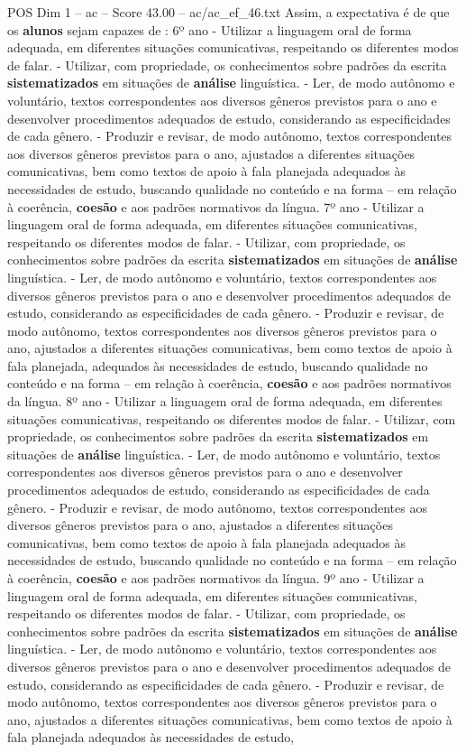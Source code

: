 \begin{textsample}{POS Dim 1 – ac – Score 43.00 – ac/ac\_ef\_46.txt}
Assim, a expectativa é de que os \textbf{alunos} sejam capazes de : 6º ano - Utilizar a linguagem oral de forma adequada, em diferentes situações comunicativas, respeitando os diferentes modos de falar. - Utilizar, com propriedade, os conhecimentos sobre padrões da escrita \textbf{sistematizados} em situações de \textbf{análise} linguística. - Ler, de modo autônomo e voluntário, textos correspondentes aos diversos gêneros previstos para o ano e desenvolver procedimentos adequados de estudo, considerando as especificidades de cada gênero. - Produzir e revisar, de modo autônomo, textos correspondentes aos diversos gêneros previstos para o ano, ajustados a diferentes situações comunicativas, bem como textos de apoio à fala planejada adequados às necessidades de estudo, buscando qualidade no conteúdo e na forma – em relação à coerência, \textbf{coesão} e aos padrões normativos da língua. 7º ano - Utilizar a linguagem oral de forma adequada, em diferentes situações comunicativas, respeitando os diferentes modos de falar. - Utilizar, com propriedade, os conhecimentos sobre padrões da escrita \textbf{sistematizados} em situações de \textbf{análise} linguística. - Ler, de modo autônomo e voluntário, textos correspondentes aos diversos gêneros previstos para o ano e desenvolver procedimentos adequados de estudo, considerando as especificidades de cada gênero. - Produzir e revisar, de modo autônomo, textos correspondentes aos diversos gêneros previstos para o ano, ajustados a diferentes situações comunicativas, bem como textos de apoio à fala planejada, adequados às necessidades de estudo, buscando qualidade no conteúdo e na forma – em relação à coerência, \textbf{coesão} e aos padrões normativos da língua. 8º ano - Utilizar a linguagem oral de forma adequada, em diferentes situações comunicativas, respeitando os diferentes modos de falar. - Utilizar, com propriedade, os conhecimentos sobre padrões da escrita \textbf{sistematizados} em situações de \textbf{análise} linguística. - Ler, de modo autônomo e voluntário, textos correspondentes aos diversos gêneros previstos para o ano e desenvolver procedimentos adequados de estudo, considerando as especificidades de cada gênero. - Produzir e revisar, de modo autônomo, textos correspondentes aos diversos gêneros previstos para o ano, ajustados a diferentes situações comunicativas, bem como textos de apoio à fala planejada adequados às necessidades de estudo, buscando qualidade no conteúdo e na forma – em relação à coerência, \textbf{coesão} e aos padrões normativos da língua. 9º ano - Utilizar a linguagem oral de forma adequada, em diferentes situações comunicativas, respeitando os diferentes modos de falar. - Utilizar, com propriedade, os conhecimentos sobre padrões da escrita \textbf{sistematizados} em situações de \textbf{análise} linguística. - Ler, de modo autônomo e voluntário, textos correspondentes aos diversos gêneros previstos para o ano e desenvolver procedimentos adequados de estudo, considerando as especificidades de cada gênero. - Produzir e revisar, de modo autônomo, textos correspondentes aos diversos gêneros previstos para o ano, ajustados a diferentes situações comunicativas, bem como textos de apoio à fala planejada adequados às necessidades de estudo, 
\end{textsample}
